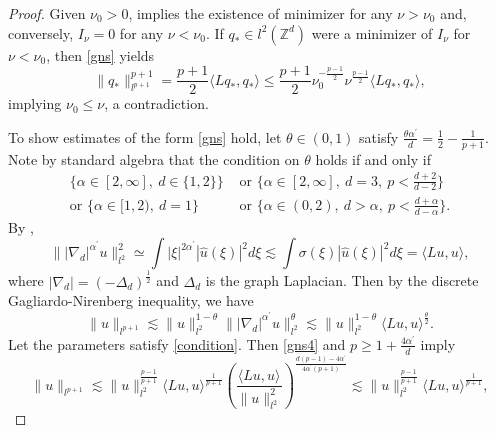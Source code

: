 \documentclass{article}
\numberwithin{equation}{section}
\begin{document}
\begin{proof}
Given $\nu_0 > 0$,  implies the existence of minimizer for any $\nu > \nu_0$ and, conversely, $I_\nu = 0$ for any $\nu < \nu_0$. If $q_* \in l^2(\mathbb{Z}^d)$ were a minimizer of $I_\nu$ for $\nu < \nu_0$, then \eqref{gns} yields 
\begin{equation}\label{no_ground}
    \| q_* \|_{l^{p+1}}^{p+1}=\frac{p+1}{2} \langle Lq_*,q_*\rangle \leq \frac{p+1}{2} \nu_0 ^{-\frac{p-1}{2}} \nu^{\frac{p-1}{2}}\langle Lq_*,q_*\rangle,
\end{equation}
implying $\nu_0 \leq \nu$, a contradiction.

To show estimates of the form \eqref{gns} hold, let $\theta \in (0,1)$ satisfy $\frac{\theta \alpha^\prime}{d} = \frac{1}{2} - \frac{1}{p+1}$. Note by standard algebra that the condition on $\theta$ holds if and only if 
\begin{equation}\label{condition}
\begin{split}
\{\alpha \in [2,\infty],\ d \in \{1,2\}\} &\text{\ or\ } \{\alpha \in [2,\infty],\ d = 3,\ p < \frac{d+2}{d-2}\}\\
\text{or\ } \{\alpha \in [1,2),\ d = 1\} &\text{\ or\ } \{\alpha \in (0,2),\ d > \alpha,\ p < \frac{d+\alpha}{d-\alpha}\}.
\end{split}
\end{equation}
By ,
\begin{equation*}
    \| |\nabla_d|^{\alpha^\prime}u\|_{l^2}^2 \simeq \int |\xi|^{2\alpha^\prime}|\widehat{u}(\xi)|^2 d\xi \lesssim \int \sigma(\xi)|\widehat{u}(\xi)|^2 d\xi = \langle Lu,u \rangle,
\end{equation*}
where $|\nabla_d| = (-\Delta_d)^{\frac{1}{2}}$ and $\Delta_d$ is the graph Laplacian. Then by the discrete Gagliardo-Nirenberg inequality, we have
\begin{equation}\label{gns4}
    \| u \|_{l^{p+1}} \lesssim \| u \|_{l^2}^{1-\theta} \| |\nabla_d|^{\alpha^\prime}u\|_{l^2}^\theta \lesssim \| u \|_{l^2}^{1-\theta} \langle Lu,u \rangle^{\frac{\theta}{2}}.
\end{equation}
Let the parameters satisfy \eqref{condition}. Then \eqref{gns4} and $p \geq 1 + \frac{4\alpha^\prime}{d}$ imply
\begin{equation*}
    \| u \|_{l^{p+1}} \lesssim \| u \|_{l^{2}}^{\frac{p-1}{p+1}} \langle Lu,u \rangle^{\frac{1}{p+1}} \left(\frac{\langle Lu,u \rangle}{\| u \|_{l^{2}}^2}\right)^{\frac{d(p-1)-4\alpha^\prime}{4\alpha^\prime(p+1)}} \lesssim \| u \|_{l^{2}}^{\frac{p-1}{p+1}} \langle Lu,u \rangle^{\frac{1}{p+1}},

\end{equation*}
\end{proof}
\end{document}
